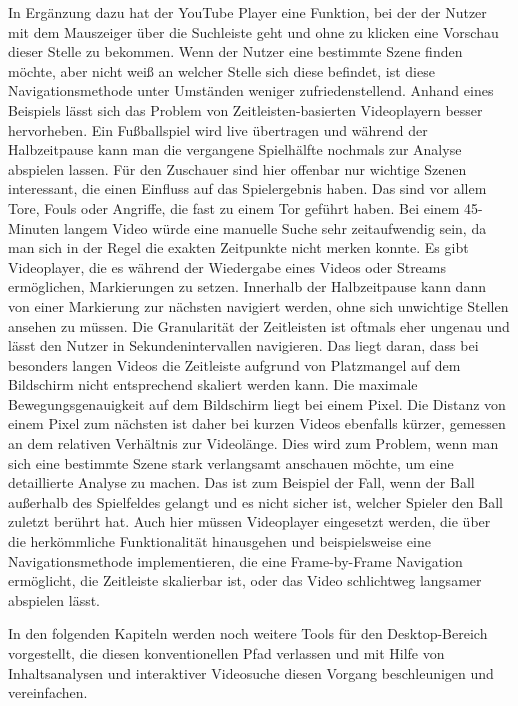 \documentclass[11pt,a4paper]{report}
\begin{document}
In Ergänzung dazu hat der YouTube Player eine Funktion, bei der der Nutzer mit dem Mauszeiger über die Suchleiste geht und ohne zu klicken eine Vorschau dieser Stelle zu bekommen. Wenn der Nutzer eine bestimmte Szene finden möchte, aber nicht weiß an welcher Stelle sich diese befindet, ist diese Navigationsmethode unter Umständen weniger zufriedenstellend. Anhand eines Beispiels lässt sich das Problem von Zeitleisten-basierten Videoplayern besser hervorheben. Ein Fußballspiel wird live übertragen und während der Halbzeitpause kann man die vergangene Spielhälfte nochmals zur Analyse abspielen lassen. Für den Zuschauer sind hier offenbar nur wichtige Szenen interessant, die einen Einfluss auf das Spielergebnis haben. Das sind vor allem Tore, Fouls oder Angriffe, die fast zu einem Tor geführt haben. Bei einem 45-Minuten langem Video würde eine manuelle Suche sehr zeitaufwendig sein, da man sich in der Regel die exakten Zeitpunkte nicht merken konnte. Es gibt Videoplayer, die es während der Wiedergabe eines Videos oder Streams ermöglichen, Markierungen zu setzen. Innerhalb der Halbzeitpause kann dann von einer Markierung zur nächsten navigiert werden, ohne sich unwichtige Stellen ansehen zu müssen. Die Granularität der Zeitleisten ist oftmals eher ungenau und lässt den Nutzer in Sekundenintervallen navigieren. Das liegt daran, dass bei besonders langen Videos die Zeitleiste aufgrund von Platzmangel auf dem Bildschirm nicht entsprechend skaliert werden kann. Die maximale Bewegungsgenauigkeit auf dem Bildschirm liegt bei einem Pixel. Die Distanz von einem Pixel zum nächsten ist daher bei kurzen Videos ebenfalls kürzer, gemessen an dem relativen Verhältnis zur Videolänge. Dies wird zum Problem, wenn man sich eine bestimmte Szene stark verlangsamt anschauen möchte, um eine detaillierte Analyse zu machen. Das ist zum Beispiel der Fall, wenn der Ball außerhalb des Spielfeldes gelangt und es nicht sicher ist, welcher Spieler den Ball zuletzt berührt hat. Auch hier müssen Videoplayer eingesetzt werden, die über die herkömmliche Funktionalität hinausgehen und beispielsweise eine Navigationsmethode implementieren, die eine Frame-by-Frame Navigation ermöglicht, die Zeitleiste skalierbar ist, oder das Video schlichtweg langsamer abspielen lässt. \cite{furht2009handbook}

In den folgenden Kapiteln werden noch weitere Tools für den Desktop-Bereich vorgestellt, die diesen konventionellen Pfad verlassen und mit Hilfe von Inhaltsanalysen und interaktiver Videosuche diesen Vorgang beschleunigen und vereinfachen.
\end{document}
